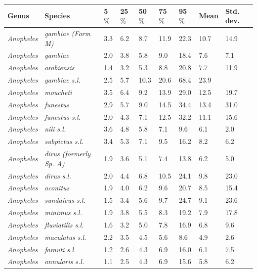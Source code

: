 \documentclass[12pt]{article}
\begin{document}
\begin{table}[htbp!]
	\begin{tabular}{l|l|l|l|l|l|l|l|l}
		\textbf{Genus} & \textbf{Species} & \textbf{5$\%$} & \textbf{25$\%$} & \textbf{50$\%$} &
		\textbf{75$\%$} & \textbf{95$\%$} & \textbf{Mean} & \textbf{Std. dev.} \\
		\hline
	\textit{Anopheles} & \textit{gambiae (Form M)} & 3.3 & 6.2 & 8.7 & 11.9 & 22.3 & 10.7 & 14.9
	\\
	\textit{Anopheles} & \textit{gambiae} & 2.0 & 3.8 & 5.8 & 9.0 & 18.4 & 7.6 & 7.1 \\
	\textit{Anopheles} & \textit{arabiensis} & 1.4 & 3.2 & 5.3 & 8.8 & 20.8 & 7.7 & 11.9 \\
	\textit{Anopheles} & \textit{gambiae s.l.} & 2.5 & 5.7 & 10.3 & 20.6 & 68.4 & 23.9 &
	\text{$>$100} \\
	\textit{Anopheles} & \textit{moucheti} & 3.5 & 6.4 & 9.2 & 13.9 & 29.0 & 12.5 & 19.7 \\
	\textit{Anopheles} & \textit{funestus} & 2.9 & 5.7 & 9.0 & 14.5 & 34.4 & 13.4 & 31.0 \\
	\textit{Anopheles} & \textit{funestus s.l.} & 2.0 & 4.3 & 7.1 & 12.5 & 32.2 & 11.1 & 15.6 \\
	\textit{Anopheles} & \textit{nili s.l.} & 3.6 & 4.8 & 5.8 & 7.1 & 9.6 & 6.1 & 2.0 \\
	\textit{Anopheles} & \textit{subpictus s.l.} & 3.4 & 5.3 & 7.1 & 9.5 & 16.2 & 8.2 & 6.2 \\
	\textit{Anopheles} & \textit{dirus (formerly Sp. A)} & 1.9 & 3.6 & 5.1 & 7.4 & 13.8 & 6.2 &
	5.0 \\
	\textit{Anopheles} & \textit{dirus s.l.} & 2.0 & 4.4 & 6.8 & 10.5 & 24.1 & 9.8 & 23.0 \\
	\textit{Anopheles} & \textit{aconitus} & 1.9 & 4.0 & 6.2 & 9.6 & 20.7 & 8.5 & 15.4 \\
	\textit{Anopheles} & \textit{sundaicus s.l.} & 1.5 & 3.4 & 5.6 & 9.7 & 24.7 & 9.1 & 23.6 \\
	\textit{Anopheles} & \textit{minimus s.l.} & 1.9 & 3.8 & 5.5 & 8.3 & 19.2 & 7.9 & 17.8 \\
	\textit{Anopheles} & \textit{fluviatilis s.l.} & 1.6 & 3.2 & 5.0 & 7.8 & 16.9 & 6.8 & 9.6 \\
	\textit{Anopheles} & \textit{maculatus s.l.} & 2.2 & 3.5 & 4.5 & 5.6 & 8.6 & 4.9 & 2.6 \\
	\textit{Anopheles} & \textit{farauti s.l.} & 1.2 & 2.6 & 4.3 & 6.9 & 16.0 & 6.1 & 7.5 \\
	\textit{Anopheles} & \textit{annularis s.l.} & 1.1 & 2.5 & 4.3 & 6.9 & 15.6 & 5.8 & 6.2 \\

\end{tabular}
\end{table}
\end{document}
